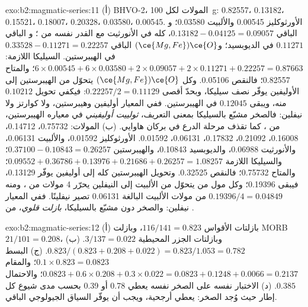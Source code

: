 \begin{solution}{exo:b2:magmatic-series:11}
(أ) BHVO-2، المولات لكل \qty{100}{g}:  0.82557،  0.13182، 
0.15521،  0.18007،  0.20328،  0.03580،  0.00545.
الأورثوكليز 0.00545 والألبيت 0.03580؛ و الباقي $0.13182 - 0.04125 = 0.09057$،
كله في الأنورثيت مع القدر نفسه من ؛ و الباقي $0.11271$ في الديوبسيد؛
و$(\ce{Mg,Fe})\ce{O}$ الباقي $0.33528 - 0.11271 = 0.22257$ في الهيبرستين. السيليكا
اللازمة: $6\times0.00545 + 6\times0.03580 + 2\times0.09057 + 2\times0.11271 + 0.22257 =
0.87663$؛ والمتاح 0.82557؛ فالنقص 0.05106. وكل $(\ce{Mg,Fe})\ce{O}$ يتحوّل من
الهيبرستين إلى الأوليفين يوفّر نصف سيليكا، وبحدّ أقصى $0.22257/2 = 0.11129$: فيكفي تحويل
$0.10212$ منه، ويبقى $0.12045$ في الهيبرستين. ففي المعيار أوليفين
وهيبرستين، ولا كوارتز ولا نيفلين: فالصخر مشبّع بالسيليكا بمعنى
التعريف، \emph{ثولييت أوليفيني} في معياره الهيبرستين، من ، كما تقذف مرحلة الدرع في بركان هاوايي. (ب) المولات: 0.75732، 0.14712، 0.16008، 0.21092، 0.17832، 0.06131،
0.01592. الأورثوكليز 0.01592، والألبيت 0.06131، والأنورثيت 0.06988، والديوبسيد 0.10843، والهيبرستين $0.37100 - 0.10843 =
0.26257$؛ والسيليكا اللازمة $0.09552 + 0.36786 + 0.13976 + 0.21686 + 0.26257 = 1.08257$؛
والمتاح 0.75732؛ فالنقص 0.32525. وتحويل الهيبرستين كله إلى أوليفين يوفّر
0.13129، فيبقى 0.19396؛ وكل مول من  يتحوّل من الألبيت إلى النيفلين
يحرّر 4 مولات من ، ومنه $0.19396/4 = 0.04849$
من مولات  الألبيت البالغة 0.06131 تصير نيفلينًا. ففي المعيار نيفلين:
والصخر دون مشبّع بالسيليكا، \emph{بازلت قلوي}، من .
\end{solution}

\begin{solution}{exo:b2:magmatic-series:12}
(أ) بازلتات الأقواس $116/141 = 0.823$، وبازلت MORB $21/101 = 0.208$، وبازلتات الجزر المحيطية
$3/137 = 0.022$. (ب) $0.823/(0.823 + 0.208 + 0.022) = 0.823/1.053 = 0.782$.
(ج) البسط $0.1\times0.823 = 0.0823$؛ والمقام $0.0823 + 0.6\times0.208 +
0.3\times0.022 = 0.0823 + 0.1248 + 0.0066 = 0.2137$؛ والاحتمال $0.385$. (د) الاختبار
نفسه على الصخر نفسه يعطي 0.78 أو 0.39 بحسب مدى شيوع كل إطار
حيث وُجد الصخر:  يعطي أرجحية، ويجب أن يوفّر
السياق الجيولوجي الباقي.
\end{solution}

